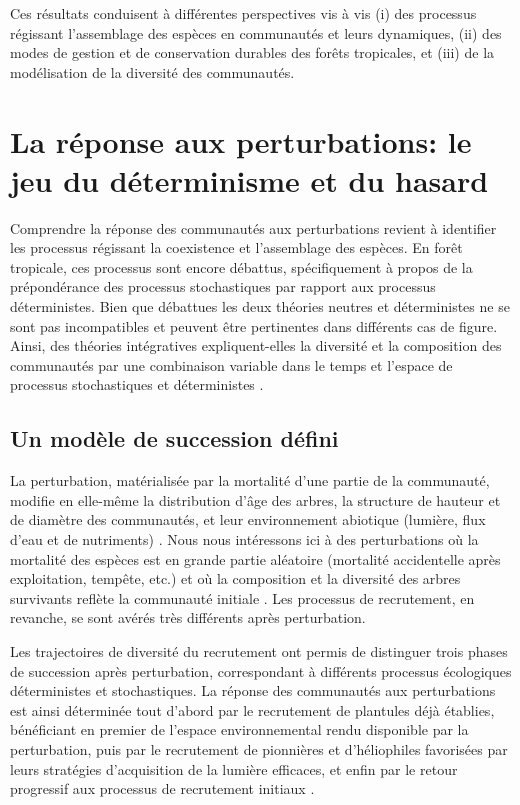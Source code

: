 \documentclass[
  11pt,
  french,
  A4paper,
  extrafontsizes,onecolumn,openright
  ]{memoir}
\begin{document}
Ces résultats conduisent à différentes perspectives vis à vis (i) des
processus régissant l'assemblage des espèces en communautés et leurs
dynamiques, (ii) des modes de gestion et de conservation durables des
forêts tropicales, et (iii) de la modélisation de la diversité des
communautés.

\section{La réponse aux perturbations: le jeu du déterminisme et du
hasard}\label{la-reponse-aux-perturbations-le-jeu-du-determinisme-et-du-hasard}

Comprendre la réponse des communautés aux perturbations revient à
identifier les processus régissant la coexistence et l'assemblage des
espèces. En forêt tropicale, ces processus sont encore débattus,
spécifiquement à propos de la prépondérance des processus stochastiques
par rapport aux processus déterministes. Bien que débattues les deux
théories neutres et déterministes ne se sont pas incompatibles et
peuvent être pertinentes dans différents cas de figure. Ainsi, des
théories intégratives expliquent-elles la diversité et la composition
des communautés par une combinaison variable dans le temps et l'espace
de processus stochastiques et déterministes
\autocites{Gravel2006}{Chase2011}.

\subsection{Un modèle de succession
défini}\label{un-modele-de-succession-defini}

La perturbation, matérialisée par la mortalité d'une partie de la
communauté, modifie en elle-même la distribution d'âge des arbres, la
structure de hauteur et de diamètre des communautés, et leur
environnement abiotique (lumière, flux d'eau et de nutriments)
\autocites{Gourlet-Fleury2000}{Putz2012}{Piponiot2016}{Rutishauser2016}.
Nous nous intéressons ici à des perturbations où la mortalité des
espèces est en grande partie aléatoire (mortalité accidentelle après
exploitation, tempête, etc.) et où la composition et la diversité des
arbres survivants reflète la communauté initiale \autocite{Herault2018}.
Les processus de recrutement, en revanche, se sont avérés très
différents après perturbation.

Les trajectoires de diversité du recrutement ont permis de distinguer
trois phases de succession après perturbation, correspondant à
différents processus écologiques déterministes et stochastiques. La
réponse des communautés aux perturbations est ainsi déterminée tout
d'abord par le recrutement de plantules déjà établies, bénéficiant en
premier de l'espace environnemental rendu disponible par la
perturbation, puis par le recrutement de pionnières et d'héliophiles
favorisées par leurs stratégies d'acquisition de la lumière efficaces,
et enfin par le retour progressif aux processus de recrutement initiaux
\autocites{Denslow2000}{Herault2010}.
\end{document}

